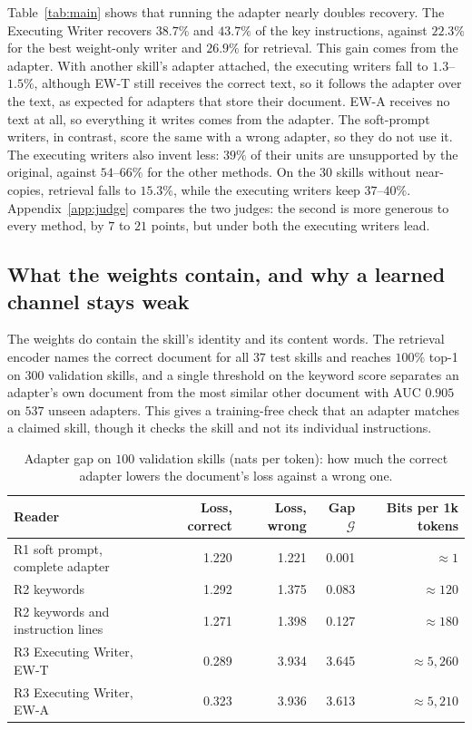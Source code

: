 \documentclass[11pt]{article}
\newcommand{\EWT}{\textsc{EW-T}}
\newcommand{\EWA}{\textsc{EW-A}}
\begin{document}
Table~\ref{tab:main} shows that running the adapter nearly doubles recovery. The Executing Writer recovers $38.7\%$ and $43.7\%$ of the key
instructions, against $22.3\%$ for the best weight-only writer and $26.9\%$ for retrieval. This gain comes from the adapter. With another skill's
adapter attached, the executing writers fall to $1.3$--$1.5\%$, although \EWT{} still receives the correct text, so it follows the adapter over the text, as expected for adapters
that store their document. \EWA{} receives no text at all, so everything it writes comes from the adapter. The soft-prompt writers, in contrast, score the same with a wrong adapter, so they do not use it.
The executing writers also invent less: $39\%$ of their units are unsupported by the original, against $54$--$66\%$ for the other methods. On the
$30$ skills without near-copies, retrieval falls to $15.3\%$, while the executing writers keep $37$--$40\%$. Appendix~\ref{app:judge} compares the
two judges: the second is more generous to every method, by $7$ to $21$ points, but under both the executing writers lead.

\subsection{What the weights contain, and why a learned channel stays weak}

The weights do contain the skill's identity and its content words. The retrieval encoder names the correct document for all $37$ test skills
and reaches $100\%$ top-1 on $300$ validation skills, and a single threshold on the keyword score separates an adapter's own document from the
most similar other document with AUC $0.905$ on $537$ unseen adapters. This gives a training-free check that an adapter matches a claimed
skill, though it checks the skill and not its individual instructions.

\begin{table}[!htb]
\centering
\caption{Adapter gap on $100$ validation skills (nats per token): how much the correct adapter lowers the document's loss against a wrong one.}
\label{tab:gap}
\small
\begin{tabular}{lrrrr}
\toprule
Reader & Loss, correct & Loss, wrong & Gap $\mathcal G$ & Bits per 1k tokens \\
\midrule
R1 soft prompt, complete adapter           & 1.220 & 1.221 & 0.001 & $\approx1$ \\
R2 keywords                                & 1.292 & 1.375 & 0.083 & $\approx120$ \\
R2 keywords and instruction lines          & 1.271 & 1.398 & 0.127 & $\approx180$ \\
R3 Executing Writer, \EWT{}                & 0.289 & 3.934 & 3.645 & $\approx5{,}260$ \\
R3 Executing Writer, \EWA{}                & 0.323 & 3.936 & 3.613 & $\approx5{,}210$ \\
\bottomrule
\end{tabular}
\end{table}
\end{document}
